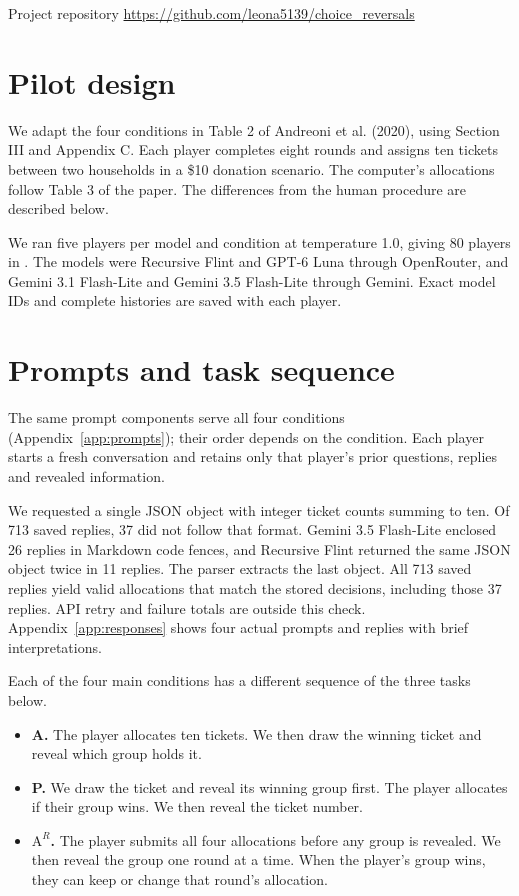 \documentclass[12pt,letterpaper]{article}
\title{\papertitle}
\author{\paperauthor}
\date{}
\begin{document}
\maketitle

\noindent Project repository \url{https://github.com/leona5139/choice_reversals}

\section{Pilot design}
We adapt the four conditions in Table 2 of Andreoni et al. (2020), using Section III and Appendix C. Each player completes eight rounds and assigns ten tickets between two households in a \$10 donation scenario. The computer's allocations follow Table 3 of the paper. The differences from the human procedure are described below.

We ran five players per model and condition at temperature 1.0, giving 80 players in . The models were Recursive Flint and GPT-6 Luna through OpenRouter, and Gemini 3.1 Flash-Lite and Gemini 3.5 Flash-Lite through Gemini. Exact model IDs and complete histories are saved with each player.

\section{Prompts and task sequence}
The same prompt components serve all four conditions (Appendix~\ref{app:prompts}); their order depends on the condition. Each player starts a fresh conversation and retains only that player's prior questions, replies and revealed information.

We requested a single JSON object with integer ticket counts summing to ten. Of 713 saved replies, 37 did not follow that format. Gemini 3.5 Flash-Lite enclosed 26 replies in Markdown code fences, and Recursive Flint returned the same JSON object twice in 11 replies. The parser extracts the last object. All 713 saved replies yield valid allocations that match the stored decisions, including those 37 replies. API retry and failure totals are outside this check. Appendix~\ref{app:responses} shows four actual prompts and replies with brief interpretations.

\noindent Each of the four main conditions has a different sequence of the three tasks below.
\begin{itemize}
    \item \textbf{A.} The player allocates ten tickets. We then draw the winning ticket and reveal which group holds it.
    \item \textbf{P.} We draw the ticket and reveal its winning group first. The player allocates if their group wins. We then reveal the ticket number.
    \item \textbf{$\mathrm{A}^{R}$.} The player submits all four allocations before any group is revealed. We then reveal the group one round at a time. When the player's group wins, they can keep or change that round's allocation.
\end{itemize}
\end{document}
